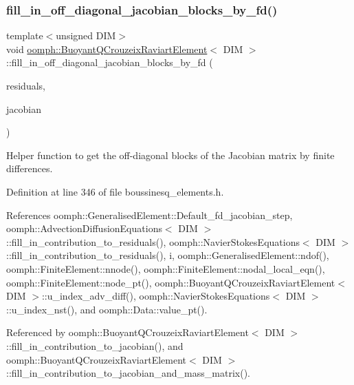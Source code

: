 \subsubsection{\texorpdfstring{fill\+\_\+in\+\_\+off\+\_\+diagonal\+\_\+jacobian\+\_\+blocks\+\_\+by\+\_\+fd()}{fill\_in\_off\_diagonal\_jacobian\_blocks\_by\_fd()}}
{\footnotesize\ttfamily template$<$unsigned D\+IM$>$ \\
void \hyperlink{classoomph_1_1BuoyantQCrouzeixRaviartElement}{oomph\+::\+Buoyant\+Q\+Crouzeix\+Raviart\+Element}$<$ D\+IM $>$\+::fill\+\_\+in\+\_\+off\+\_\+diagonal\+\_\+jacobian\+\_\+blocks\+\_\+by\+\_\+fd (\begin{DoxyParamCaption}\item[{\hyperlink{classoomph_1_1Vector}{Vector}$<$ double $>$ \&}]{residuals,  }\item[{\hyperlink{classoomph_1_1DenseMatrix}{Dense\+Matrix}$<$ double $>$ \&}]{jacobian }\end{DoxyParamCaption})\hspace{0.3cm}{\ttfamily [inline]}}



Helper function to get the off-\/diagonal blocks of the Jacobian matrix by finite differences. 



Definition at line 346 of file boussinesq\+\_\+elements.\+h.



References oomph\+::\+Generalised\+Element\+::\+Default\+\_\+fd\+\_\+jacobian\+\_\+step, oomph\+::\+Advection\+Diffusion\+Equations$<$ D\+I\+M $>$\+::fill\+\_\+in\+\_\+contribution\+\_\+to\+\_\+residuals(), oomph\+::\+Navier\+Stokes\+Equations$<$ D\+I\+M $>$\+::fill\+\_\+in\+\_\+contribution\+\_\+to\+\_\+residuals(), i, oomph\+::\+Generalised\+Element\+::ndof(), oomph\+::\+Finite\+Element\+::nnode(), oomph\+::\+Finite\+Element\+::nodal\+\_\+local\+\_\+eqn(), oomph\+::\+Finite\+Element\+::node\+\_\+pt(), oomph\+::\+Buoyant\+Q\+Crouzeix\+Raviart\+Element$<$ D\+I\+M $>$\+::u\+\_\+index\+\_\+adv\+\_\+diff(), oomph\+::\+Navier\+Stokes\+Equations$<$ D\+I\+M $>$\+::u\+\_\+index\+\_\+nst(), and oomph\+::\+Data\+::value\+\_\+pt().



Referenced by oomph\+::\+Buoyant\+Q\+Crouzeix\+Raviart\+Element$<$ D\+I\+M $>$\+::fill\+\_\+in\+\_\+contribution\+\_\+to\+\_\+jacobian(), and oomph\+::\+Buoyant\+Q\+Crouzeix\+Raviart\+Element$<$ D\+I\+M $>$\+::fill\+\_\+in\+\_\+contribution\+\_\+to\+\_\+jacobian\+\_\+and\+\_\+mass\+\_\+matrix().

